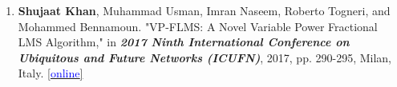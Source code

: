 \begin{enumerate}
  

    \item \textbf{Shujaat Khan}, Muhammad Usman, Imran Naseem, Roberto Togneri, and Mohammed Bennamoun. "VP-FLMS: A Novel Variable Power Fractional LMS Algorithm," in \textit{\textbf{2017 Ninth International Conference on Ubiquitous and Future Networks (ICUFN)}}, 2017, pp. 290-295, Milan, Italy. \href{https://doi.org/10.1109/ICUFN.2017.7993796}{[\textcolor{blue}{online}]} 

    
    
\end{enumerate}


